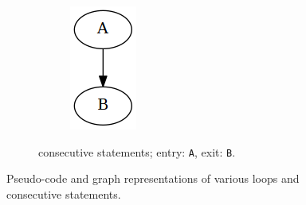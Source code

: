 \begin{figure}[htbp]
\begin{subfigure}[ht]{0.24\textwidth}
\begin{subfigure}[ht]{0.35\textwidth}
			\includegraphics[width=\textwidth]{inc/primitives/list.png}
		\end{subfigure}
		\caption{consecutive statements; entry: \texttt{A}, exit: \texttt{B}.}
	\end{subfigure}
	\caption{Pseudo-code and graph representations of various loops and consecutive statements.}
\end{figure}
